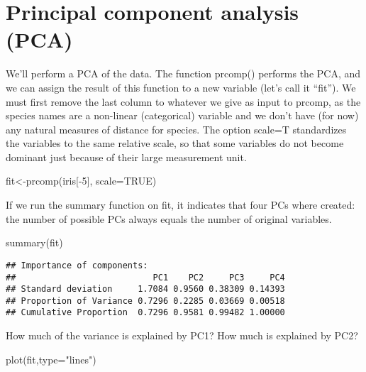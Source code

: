 \documentclass[
]{book}
\newenvironment{Shaded}{\begin{snugshade}}{\end{snugshade}}
\newcommand{\AttributeTok}[1]{\textcolor[rgb]{0.77,0.63,0.00}{#1}}
\newcommand{\ConstantTok}[1]{\textcolor[rgb]{0.00,0.00,0.00}{#1}}
\newcommand{\DecValTok}[1]{\textcolor[rgb]{0.00,0.00,0.81}{#1}}
\newcommand{\FunctionTok}[1]{\textcolor[rgb]{0.00,0.00,0.00}{#1}}
\newcommand{\NormalTok}[1]{#1}
\newcommand{\OtherTok}[1]{\textcolor[rgb]{0.56,0.35,0.01}{#1}}
\newcommand{\SpecialCharTok}[1]{\textcolor[rgb]{0.00,0.00,0.00}{#1}}
\newcommand{\StringTok}[1]{\textcolor[rgb]{0.31,0.60,0.02}{#1}}
\begin{document}
\hypertarget{principal-component-analysis-pca}{%
\section{Principal component analysis (PCA)}\label{principal-component-analysis-pca}}

We'll perform a PCA of the data. The function prcomp() performs the PCA, and we can assign the result of this function to a new variable (let's call it ``fit''). We must first remove the last column to whatever we give as input to prcomp, as the species names are a non-linear (categorical) variable and we don't have (for now) any natural measures of distance for species. The option scale=T standardizes the variables to the same relative scale, so that some variables do not become dominant just because of their large measurement unit.

\begin{Shaded}
\begin{Highlighting}[]
\NormalTok{fit}\OtherTok{\textless{}{-}}\FunctionTok{prcomp}\NormalTok{(iris[}\SpecialCharTok{{-}}\DecValTok{5}\NormalTok{], }\AttributeTok{scale=}\ConstantTok{TRUE}\NormalTok{)}
\end{Highlighting}
\end{Shaded}

If we run the summary function on fit, it indicates that four PCs where created: the number of possible PCs always equals the number of original variables.

\begin{Shaded}
\begin{Highlighting}[]
\FunctionTok{summary}\NormalTok{(fit)}
\end{Highlighting}
\end{Shaded}

\begin{verbatim}
## Importance of components:
##                           PC1    PC2     PC3     PC4
## Standard deviation     1.7084 0.9560 0.38309 0.14393
## Proportion of Variance 0.7296 0.2285 0.03669 0.00518
## Cumulative Proportion  0.7296 0.9581 0.99482 1.00000
\end{verbatim}

How much of the variance is explained by PC1? How much is explained by PC2?

\begin{Shaded}
\begin{Highlighting}[]
\FunctionTok{plot}\NormalTok{(fit,}\AttributeTok{type=}\StringTok{"lines"}\NormalTok{)}
\end{Highlighting}
\end{Shaded}
\end{document}
